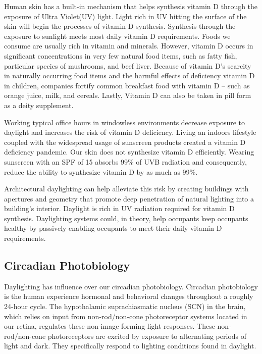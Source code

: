 Human skin has a built-in mechanism that helps synthesis vitamin D through the exposure of Ultra Violet(UV) light. Light rich in UV hitting the surface of the skin will begin the processes of vitamin D synthesis. Synthesis through the exposure to sunlight meets most daily vitamin D requirements. Foods we consume are usually rich in vitamin and minerals. However, vitamin D occurs in significant concentrations in very few natural food items, such as fatty fish, particular species of mushrooms, and beef liver.  Because of vitamin D's scarcity in naturally occurring food items and the harmful effects of deficiency vitamin D  in children, companies fortify common breakfast food with vitamin D -- such as orange juice, milk, and cereals. Lastly, Vitamin D can also be taken in pill form as a deity supplement.

Working typical office hours in windowless environments decrease exposure to daylight and increases the risk of vitamin D deficiency. Living an indoors lifestyle coupled with the widespread usage of sunscreen products created a vitamin D deficiency pandemic.  Our skin does not synthesize vitamin D efficiently. Wearing sunscreen with an SPF of 15 absorbs 99\% of UVB radiation and consequently, reduce the ability to synthesize vitamin D by as much as 99\%\cite{Holick}.  

Architectural daylighting can help alleviate this risk by creating buildings with apertures and geometry that promote deep penetration of natural lighting into a building's interior. Daylight is rich in UV radiation required for vitamin D synthesis.  Daylighting systems could, in theory, help occupants keep occupants healthy by passively enabling occupants to meet their daily vitamin D requirements.

\subsection{Circadian Photobiology}
Daylighting has influence over our circadian photobiology. Circadian photobiology is the human experience hormonal and behavioral changes throughout a roughly 24-hour cycle. The hypothalamic suprachiasmatic nucleus (SCN)  in the brain, which relies on input from non-rod/non-cone photoreceptor systems located in our retina, regulates these non-image forming light responses. These non-rod/non-cone photoreceptors are excited by exposure to alternating periods of light and dark. They specifically respond to lighting conditions found in daylight\cite{Rea,Thapan}.

